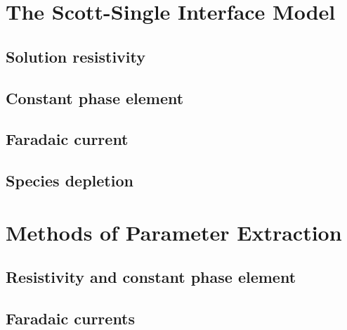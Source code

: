 
\section{The Scott-Single Interface Model}
  \subsection{Solution resistivity}
  \subsection{Constant phase element}
  \subsection{Faradaic current}
  \subsection{Species depletion}
\section{Methods of Parameter Extraction}
  \subsection{Resistivity and constant phase element}
  \subsection{Faradaic currents}

